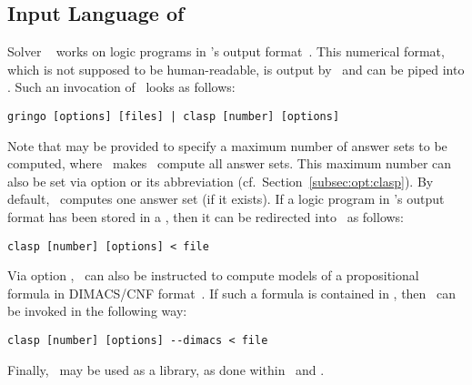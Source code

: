 \subsection{Input Language of \clasp}\label{subsec:lang:clasp}

Solver \clasp~\cite{gekanesc07b} works on logic programs in \lparse's
output format~\cite{lparseManual}.
This numerical format, which is not supposed to be human-readable,
is output by \gringo\ and can be piped into \clasp.
Such an invocation of \clasp\ looks as follows:
%
\begin{lstlisting}[numbers=none]
gringo [options] [files] | clasp [number] [options]
\end{lstlisting}
%
Note that  may be provided to specify a maximum number of answer sets
to be computed, where~ makes \clasp\ compute all answer sets.
This maximum number can also be set via
option  or its abbreviation 
(cf.\ Section~\ref{subsec:opt:clasp}).
By default, \clasp\ computes one answer set (if it exists).
If a logic program in \lparse's output format has been stored in a ,
then it can be redirected into \clasp\ as follows:
%
\begin{lstlisting}[numbers=none]
clasp [number] [options] < file
\end{lstlisting}
%
Via option ,
\clasp\ can also be instructed to compute models of a propositional formula
in DIMACS/CNF format~\cite{dimacs}.
If such a formula is contained in ,
then \clasp\ can be invoked in the following way:
%
\begin{lstlisting}[numbers=none]
clasp [number] [options] --dimacs < file
\end{lstlisting}
%
Finally, \clasp\ may be used as a library, as done within \clingo\ and \iclingo.


